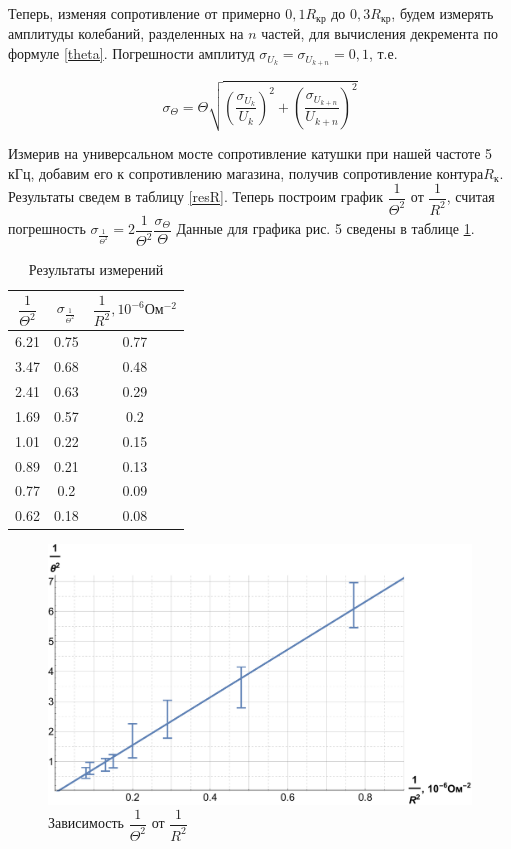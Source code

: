 \documentclass[12pt]{kiarticle}
\begin{document}
Теперь, изменяя сопротивление от примерно $ 0,1 R_{кр} $ до $ 0,3 R_{кр} $, будем измерять амплитуды колебаний, разделенных на $ n $ частей, для вычисления декремента по формуле \eqref{theta}. Погрешности амплитуд $  \sigma_{U_k} = \sigma_{U_{k+n}} = 0,1 $, т.е. 

\begin{equation}\label{}
\sigma_{\Theta} = \Theta \sqrt{ \left( \dfrac{ \sigma_{U_k}}{U_k} \right)^2 + \left( \dfrac{ \sigma_{U_{k+n}} }{U_{k+n}} \right)^2 }
\end{equation}

Измерив на универсальном мосте сопротивление катушки при нашей частоте 5 кГц, добавим его к сопротивлению магазина, получив сопротивление контура$ R_к $. Результаты сведем в таблицу \ref{resR}. Теперь построим график $ \dfrac{1}{\Theta^2} $ от $ \dfrac{1}{R^2} $, считая погрешность $ \sigma_{\frac{1}{\Theta^2}} = 2 \dfrac{1}{\Theta^2} \dfrac{\sigma_\Theta}{\Theta}$ Данные для графика  рис. 5 сведены в таблице \ref{res}.



\begin{table}[h!]
	\centering
	\caption{Результаты измерений}
	\begin{tabular}{|c|c|c|}
		\hline
	$ \dfrac{1}{\Theta^2} $& $ \sigma_{\frac{1}{\Theta^2}} $ & $ \dfrac{1}{R^2}, 10^{-6} Ом^{-2}$  \\
		\hline
		6.21 & 0.75 & 0.77 \\
		3.47 & 0.68 & 0.48 \\
		2.41 & 0.63 & 0.29 \\
		1.69 & 0.57 & 0.2 \\
		1.01 & 0.22 & 0.15 \\
		0.89 & 0.21 & 0.13 \\
		0.77 & 0.2 & 0.09 \\
		0.62 & 0.18 & 0.08 \\
		\hline
	\end{tabular}%
	\label{res}%
\end{table}%

\begin{figure}[h!]
	\includegraphics[scale=0.5]{teta.pdf}
	\caption{Зависимость $ \dfrac{1}{\Theta^2} $ от $ \dfrac{1}{R^2} $}
\end{figure}
\end{document}
